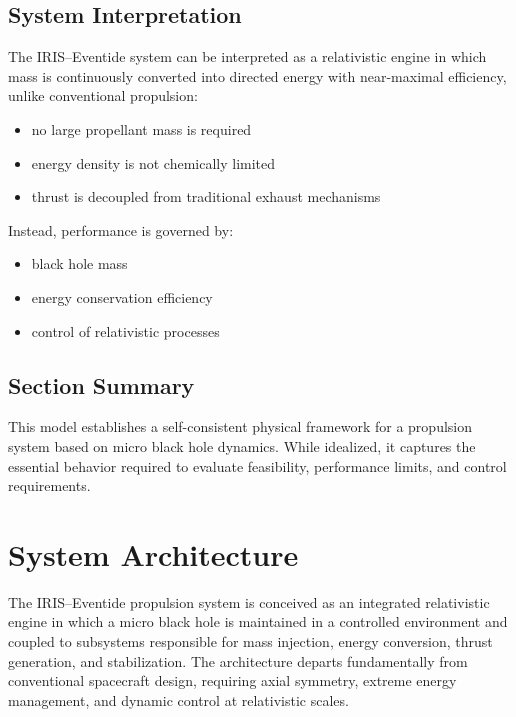 \documentclass[conference]{IEEEtran}
\begin{document}
\subsection{System Interpretation}
The IRIS–Eventide system can be interpreted as a relativistic engine in which mass is continuously converted into directed energy with near-maximal efficiency, unlike conventional propulsion:
\begin{itemize}
\item no large propellant mass is required
\item energy density is not chemically limited
\item thrust is decoupled from traditional exhaust mechanisms
\end{itemize}
Instead, performance is governed by:
\begin{itemize}
\item black hole mass
\item energy conservation efficiency
\item control of relativistic processes
\end{itemize}
\subsection{Section Summary}
This model establishes a self-consistent physical framework for a propulsion system based on micro black hole dynamics. While idealized, it captures the essential behavior required to evaluate feasibility, performance limits, and control requirements.
\section{System Architecture}
The IRIS–Eventide propulsion system is conceived as an integrated relativistic engine in which a micro black hole is maintained in a controlled environment and coupled to subsystems responsible for mass injection, energy conversion, thrust generation, and stabilization. The architecture departs fundamentally from conventional spacecraft design, requiring axial symmetry, extreme energy management, and dynamic control at relativistic scales.
\end{document}
